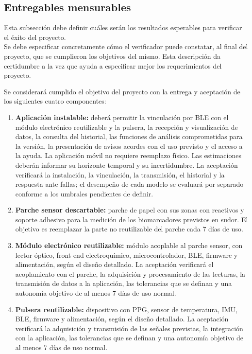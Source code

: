 \subsection{Entregables mensurables}
{\consigna
Esta subsección debe definir cuáles serán los resultados esperables para verificar el éxito del proyecto.\\
Se debe especificar concretamente cómo el verificador puede constatar, al final del proyecto, que se cumplieron los objetivos del mismo. Esta descripción da certidumbre a la vez que ayuda a especificar mejor los requerimientos del proyecto.
}


Se considerará cumplido el objetivo del proyecto con la entrega y aceptación de los siguientes cuatro componentes:

\begin{enumerate}
    \item \textbf{Aplicación instalable:} deberá permitir la vinculación por BLE con el módulo electrónico reutilizable y la pulsera, la recepción y visualización de datos, la consulta del historial, las funciones de análisis comprometidas para la versión, la presentación de avisos acordes con el uso previsto y el acceso a la ayuda. La aplicación móvil no requiere reemplazo físico. Las estimaciones deberán informar su horizonte temporal y su incertidumbre. La aceptación verificará la instalación, la vinculación, la transmisión, el historial y la respuesta ante fallas; el desempeño de cada modelo se evaluará por separado conforme a los umbrales pendientes de definir.
    \item \textbf{Parche sensor descartable:} parche de papel con sus zonas con reactivos y soporte adhesivo para la medición de los biomarcadores previstos en sudor. El objetivo es reemplazar la parte no reutilizable del parche cada 7 días de uso.
    \item \textbf{Módulo electrónico reutilizable:} módulo acoplable al parche sensor, con lector óptico, front-end electroquímico, microcontrolador, BLE, firmware y alimentación, según el diseño detallado. La aceptación verificará el acoplamiento con el parche, la adquisición y procesamiento de las lecturas, la transmisión de datos a la aplicación, las tolerancias que se definan y una autonomía objetivo de al menos 7 días de uso normal.
    \item \textbf{Pulsera reutilizable:} dispositivo con PPG, sensor de temperatura, IMU, BLE, firmware y alimentación, según el diseño detallado. La aceptación verificará la adquisición y transmisión de las señales previstas, la integración con la aplicación, las tolerancias que se definan y una autonomía objetivo de al menos 7 días de uso normal. 
\end{enumerate}

